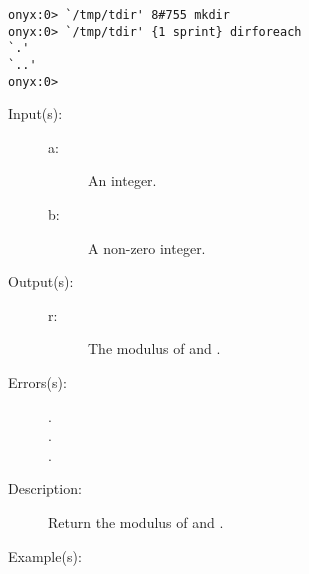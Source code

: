 \begin{description}
\begin{description}
\begin{verbatim}
onyx:0> `/tmp/tdir' 8#755 mkdir
onyx:0> `/tmp/tdir' {1 sprint} dirforeach
`.'
`..'
onyx:0>
		\end{verbatim}
	\end{description}
\label{systemdict:mod}
\item[{\onyxop{a b}{mod}{r}}: ]
	\begin{description}\item[]
	\item[Input(s): ]
		\begin{description}\item[]
		\item[a: ]
			An integer.
		\item[b: ]
			A non-zero integer.
		\end{description}
	\item[Output(s): ]
		\begin{description}\item[]
		\item[r: ]
			The modulus of  and .
		\end{description}
	\item[Errors(s): ]
		\begin{description}\item[]
		\item[.]
		\item[.]
		\item[.]
		\end{description}
	\item[Description: ]
			Return the modulus of  and .
	\item[Example(s): ]\begin{verbatim}


\end{verbatim}
\end{description}
\end{description}
